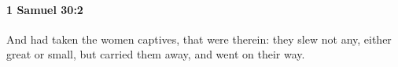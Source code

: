 
		\paragraph{1 Samuel 30:2} %
			\label{1SAMUEL-30-2}

			And had taken the women captives, that were therein: they slew not any, either great or small, but carried them away, and went on their way.


